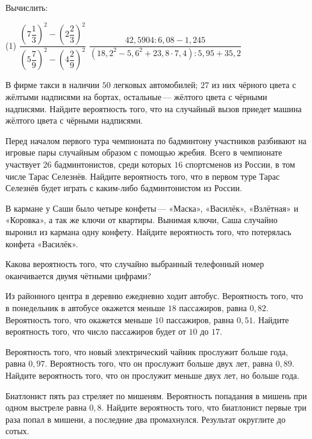 %
%

\begin{class}[number=1]
	\begin{listofex}
		\item Вычислить:
		\begin{tasks}(1)
			\task \( \dfrac{\left( 7\dfrac{1}{3} \right)^2-\left( 2\dfrac{2}{3} \right)^2}{\left( 5\dfrac{7}{9} \right)^2-\left( 4\dfrac{2}{9} \right)^2} \)
			\task \( \dfrac{42,5904:6,08-1,245}{(18,2^2-5,6^2+23,8\cdot7,4):5,95+35,2} \)
		\end{tasks}
		\item В фирме такси в наличии \( 50 \) легковых автомобилей; \( 27 \) из них чёрного цвета с жёлтыми надписями на бортах, остальные --- жёлтого цвета с чёрными надписями. Найдите вероятность того, что на случайный вызов приедет машина жёлтого цвета с чёрными надписями.
		\item Перед началом первого тура чемпионата по бадминтону участников разбивают на игровые пары случайным образом с помощью жребия. Всего в чемпионате участвует \( 26 \) бадминтонистов, среди которых \( 16 \) спортсменов из России, в том числе Тарас Селезнёв. Найдите вероятность того, что в первом туре Тарас Селезнёв будет играть с каким-либо бадминтонистом из России.
		\item В кармане у Саши было четыре конфеты --- «Маска», «Василёк», «Взлётная» и «Коровка», а так же ключи от квартиры. Вынимая ключи, Саша случайно выронил из кармана одну конфету. Найдите вероятность того, что потерялась конфета «Василёк».
		\item Какова вероятность того, что случайно выбранный телефонный номер оканчивается двумя чётными цифрами?
		\item Из районного центра в деревню ежедневно ходит автобус. Вероятность того, что в понедельник в автобусе окажется меньше \( 18 \) пассажиров, равна \( 0,82 \). Вероятность того, что окажется меньше \( 10 \) пассажиров, равна \( 0,51 \). Найдите вероятность того, что число пассажиров будет от \( 10 \) до \( 17 \).
		\item Вероятность того, что новый электрический чайник прослужит больше года, равна \( 0,97 \). Вероятность того, что он прослужит больше двух лет, равна \( 0,89 \). Найдите вероятность того, что он прослужит меньше двух лет, но больше года.
		\item Биатлонист пять раз стреляет по мишеням. Вероятность попадания в мишень при одном выстреле равна \( 0,8 \). Найдите вероятность того, что биатлонист первые три раза попал в мишени, а последние два промахнулся. Результат округлите до сотых.

\end{listofex}
\end{class}
